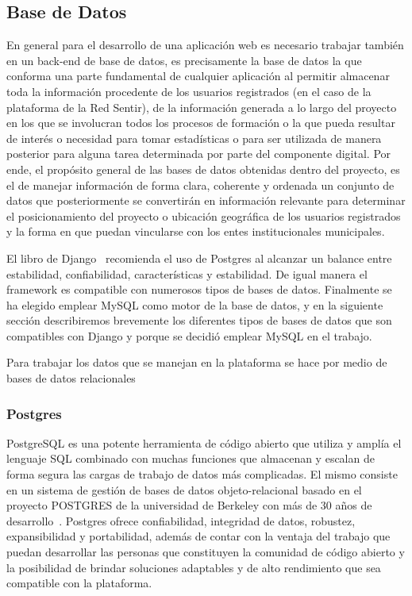 \documentclass[a4paper]{article}
\begin{document}
\subsection{Base de Datos}
En general para el desarrollo de una aplicación web es necesario trabajar también en un back-end de base de datos, es precisamente la base de datos la que conforma una parte fundamental de cualquier aplicación al permitir almacenar toda la información procedente de los usuarios registrados (en el caso de la plataforma de la Red Sentir), de la información generada a lo largo del proyecto en los que se involucran todos los procesos de formación o la que pueda resultar de interés o necesidad para tomar estadísticas o para ser utilizada de manera posterior para alguna tarea determinada por parte del componente digital. Por ende, el propósito general de las bases de datos obtenidas dentro del proyecto, es el de manejar información de forma clara, coherente y ordenada un conjunto de datos que posteriormente se convertirán en información relevante para determinar el posicionamiento del proyecto o ubicación geográfica de los usuarios registrados y la forma en que puedan vincularse con los entes institucionales municipales. 

El libro de Django~\citep{DjangoM} recomienda el uso de Postgres al alcanzar un balance entre estabilidad, confiabilidad, características y estabilidad. De igual manera el framework es compatible con numerosos tipos de bases de datos. Finalmente se ha elegido emplear MySQL como motor de la base de datos, y en la siguiente sección describiremos brevemente los diferentes tipos de bases de datos que son compatibles con Django y porque se decidió emplear MySQL en el trabajo.

Para trabajar los datos que se manejan en la plataforma se hace por medio de bases de datos relacionales
\subsubsection{Postgres}
PostgreSQL es una potente herramienta de código abierto que utiliza y amplía el lenguaje SQL combinado con muchas funciones que almacenan y escalan de forma segura las cargas de trabajo de datos más complicadas. El mismo consiste en un sistema de gestión de bases de datos objeto-relacional basado en el proyecto POSTGRES de la universidad de Berkeley con más de 30 años de desarrollo~\citep{Postgres}. Postgres ofrece confiabilidad, integridad de datos, robustez, expansibilidad y portabilidad, además de contar con la ventaja del trabajo que puedan desarrollar las personas que constituyen la comunidad de código abierto y la posibilidad de brindar soluciones adaptables y de alto rendimiento que sea compatible con la plataforma. 
\end{document}
